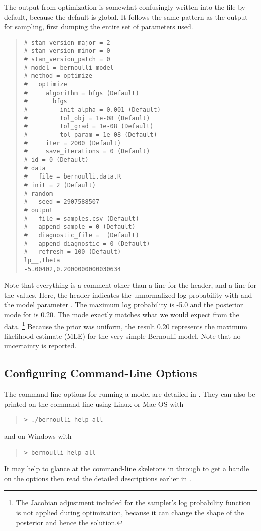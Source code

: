 The output from optimization is somewhat confusingly written into the
file  by default, because the default is global.
It follows the same pattern as the output for sampling, first dumping
the entire set of parameters used.
%
\begin{quote}
\begin{Verbatim}[fontsize=\small]
# stan_version_major = 2
# stan_version_minor = 0
# stan_version_patch = 0
# model = bernoulli_model
# method = optimize
#   optimize
#     algorithm = bfgs (Default)
#       bfgs
#         init_alpha = 0.001 (Default)
#         tol_obj = 1e-08 (Default)
#         tol_grad = 1e-08 (Default)
#         tol_param = 1e-08 (Default)
#     iter = 2000 (Default)
#     save_iterations = 0 (Default)
# id = 0 (Default)
# data
#   file = bernoulli.data.R
# init = 2 (Default)
# random
#   seed = 2907588507
# output
#   file = samples.csv (Default)
#   append_sample = 0 (Default)
#   diagnostic_file =  (Default)
#   append_diagnostic = 0 (Default)
#   refresh = 100 (Default)
lp__,theta
-5.00402,0.2000000000030634
\end{Verbatim}
\end{quote}
%
Note that everything is a comment other than a line for the header,
and a line for the values.  Here, the header indicates the
unnormalized log probability with  and the model
parameter .  The maximum log probability is -5.0 and the
posterior mode for  is 0.20.  The mode exactly matches
what we would expect from the data.  
%
\footnote{The Jacobian adjustment included for the sampler's log
  probability function is not applied during optimization, because it can
  change the shape of the posterior and hence the solution.}
%
Because the prior was uniform, the result 0.20 represents the maximum
likelihood estimate (MLE) for the very simple Bernoulli model.  Note
that no uncertainty is reported.  


\subsection{Configuring Command-Line Options}

The command-line options for running a model are detailed in
. They can also be printed on the command line
using Linux or Mac OS with
%
\begin{quote}
\begin{Verbatim}[fontshape=sl]
> ./bernoulli help-all
\end{Verbatim}
\end{quote}
%
and on Windows with
%
\begin{quote}
\begin{Verbatim}[fontshape=sl]
> bernoulli help-all
\end{Verbatim}
\end{quote}
%
It may help to glance at the command-line skeletons in
 through  to get
a handle on the options then read the detailed descriptions earlier in
.

